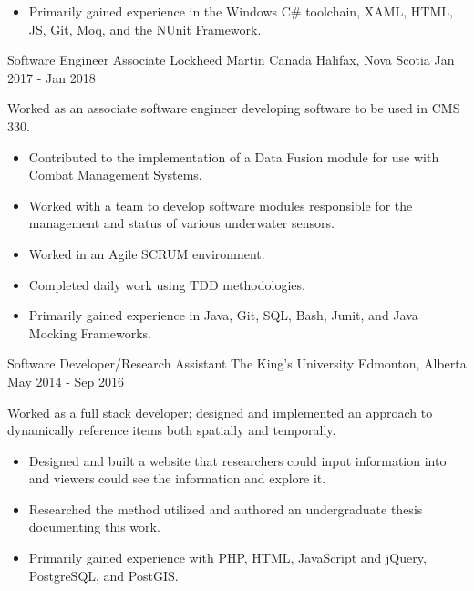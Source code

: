 \begin{cventries}
{\begin{itemize}
                \item Primarily gained experience in the Windows C\# toolchain, XAML, HTML, JS, Git, Moq, and the NUnit Framework.
            \end{itemize}
        }
    \cventry
        {Software Engineer Associate}
        {Lockheed Martin Canada}
        {Halifax, Nova Scotia}
        {Jan 2017 - Jan 2018}
        {
            Worked as an associate software engineer developing software to be used in CMS 330.
            \begin{itemize}
                \item Contributed to the implementation of a Data Fusion module for use with Combat Management Systems.
                \item Worked with a team to develop software modules responsible for the management and status of various underwater sensors.
                \item Worked in an Agile SCRUM environment.
                \item Completed daily work using TDD methodologies.
                \item Primarily gained experience in Java, Git, SQL, Bash, Junit, and Java Mocking Frameworks.
            \end{itemize}
        }
    \cventry
        {Software Developer/Research Assistant}
        {The King's University}
        {Edmonton, Alberta}
        {May 2014 - Sep 2016}
        {
            Worked as a full stack developer; designed and implemented an approach to dynamically reference items both spatially and temporally.
            \begin{itemize}
                \item Designed and built a website that researchers could input information into and viewers could see the information and explore it.
                \item Researched the method utilized and authored an undergraduate thesis documenting this work.
                \item Primarily gained experience with PHP, HTML, JavaScript and jQuery, PostgreSQL, and PostGIS.
            \end{itemize}
        }

\end{cventries}